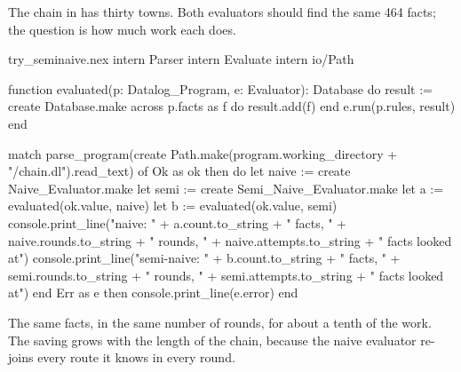 The chain in  has thirty towns. Both evaluators should find
the same 464 facts; the question is how much work each does.

\begin{tryit}{try_seminaive.nex}
intern Parser
intern Evaluate
intern io/Path

function evaluated(p: Datalog_Program, e: Evaluator): Database
do
  result := create Database.make
  across p.facts as f do
    result.add(f)
  end
  e.run(p.rules, result)
end

match parse_program(create Path.make(program.working_directory + "/chain.dl").read_text) of
  Ok as ok then
    do
      let naive := create Naive_Evaluator.make
      let semi := create Semi_Naive_Evaluator.make
      let a := evaluated(ok.value, naive)
      let b := evaluated(ok.value, semi)
      console.print_line("naive:       " + a.count.to_string + " facts, "
        + naive.rounds.to_string + " rounds, " + naive.attempts.to_string + " facts looked at")
      console.print_line("semi-naive:  " + b.count.to_string + " facts, "
        + semi.rounds.to_string + " rounds, " + semi.attempts.to_string + " facts looked at")
    end
  Err as e then console.print_line(e.error)
end
\end{tryit}

The same facts, in the same number of rounds, for about a tenth of the work.
The saving grows with the length of the chain, because the naive evaluator
re-joins every route it knows in every round.

